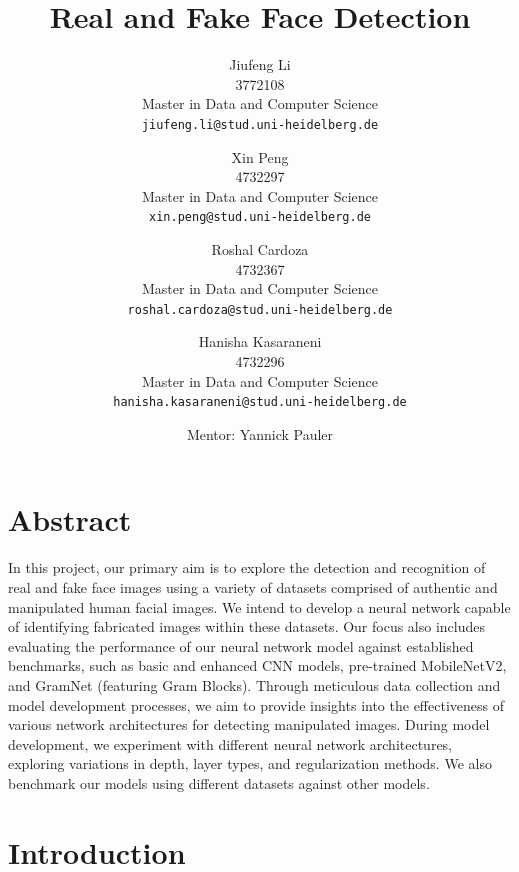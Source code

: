 \documentclass[final]{cvpr}
\begin{document}
\title{Real and Fake Face Detection}  %


\author{Jiufeng Li\\
3772108\\
Master in Data and Computer Science\\
{\tt\small jiufeng.li@stud.uni-heidelberg.de}
\and
Xin Peng\\
4732297\\
Master in Data and Computer Science\\
{\tt\small xin.peng@stud.uni-heidelberg.de}
\and
Roshal Cardoza\\
4732367\\
Master in Data and Computer Science\\
{\tt\small roshal.cardoza@stud.uni-heidelberg.de}
\and
Hanisha Kasaraneni\\
4732296\\
Master in Data and Computer Science\\
{\tt\small hanisha.kasaraneni@stud.uni-heidelberg.de}
\and
Mentor: Yannick Pauler
}

\maketitle
\thispagestyle{empty}


\section{Abstract}
In this project, our primary aim is to explore the detection and recognition of real and fake face images using a variety of datasets comprised of authentic and manipulated human facial images. We intend to develop a neural network capable of identifying fabricated images within these datasets. Our focus also includes evaluating the performance of our neural network model against established benchmarks, such as basic and enhanced CNN models, pre-trained MobileNetV2, and GramNet (featuring Gram Blocks). Through meticulous data collection and model development processes, we aim to provide insights into the effectiveness of various network architectures for detecting manipulated images. During model development, we experiment with different neural network architectures, exploring variations in depth, layer types, and regularization methods. We also benchmark our models using different datasets against other models.
 

\section{Introduction}
\end{document}
